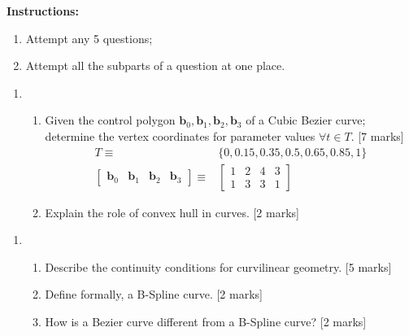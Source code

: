 \documentclass[11pt]{tiet-question-paper}
\date{\today}
\title{}
\begin{document}
\maketitle

\textbf{Instructions:}
\begin{enumerate}
\item Attempt any 5 questions;
\item Attempt all the subparts of a question at one place.
\end{enumerate}

\bvrhrule\bvrskipline

\begin{enumerate}
\item \begin{enumerate}
\item Given the control polygon \(\textbf{b}_0,
      \textbf{b}_1, \textbf{b}_2, \textbf{b}_3\) of a
Cubic Bezier curve; determine the vertex
coordinates for parameter values \(\forall t\in
      T\). \hfill [7 marks]
\begin{align*}
  T \equiv
  & \{0, 0.15, 0.35, 0.5, 0.65, 0.85, 1\} \\
  \begin{bmatrix}
    \textbf{b}_0 &\textbf{b}_1& \textbf{b}_2& \textbf{b}_3
  \end{bmatrix} \equiv& \begin{bmatrix}
    1&2&4&3\\ 1&3&3&1
  \end{bmatrix}
\end{align*}

\item Explain the role of convex hull in curves.
\hfill[2 marks]
\end{enumerate}
\end{enumerate}

\bvrhrule

\begin{enumerate}[resume]
\item \begin{enumerate}
\item Describe the continuity conditions for
curvilinear geometry.  \hfill[5 marks]
\item Define formally, a B-Spline curve. \hfill [2
marks]
\item How is a Bezier curve different from a B-Spline
curve? \hfill [2 marks]
\end{enumerate}
\end{enumerate}
\end{document}
